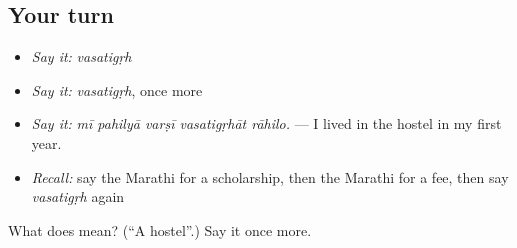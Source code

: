 \subsection*{Your turn}
\begin{itemize}
\raggedright
  \item \emph{Say it:} \emph{vasatigṛh}
  \item \emph{Say it:} \emph{vasatigṛh}, once more
  \item \emph{Say it:} \emph{mī pahilyā varṣī vasatigṛhāt rāhilo.} — I lived in the hostel in my first year.
  \item \emph{Recall:} say the Marathi for a scholarship, then the Marathi for a fee, then say \emph{vasatigṛh} again
\end{itemize}

\begin{tcolorbox}[breakable,colback=teal!4,colframe=teal!35!black,title={Before you move on}]
What does  mean? (\textquotedblleft{}A hostel\textquotedblright{}.) Say it once more.
\end{tcolorbox}
